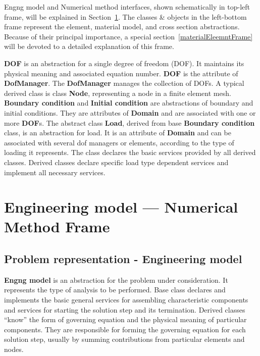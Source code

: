 \documentclass[12pt,draft]{article}
\newcommand{\class}[1]{{\bf #1}}
\begin{document}

Engng model and Numerical method interfaces, shown schematically in
top-left frame, will be explained in
Section~\ref{engngNummetsection}. The classes \& objects in the left-bottom frame represent the element,
material model, and cross section abstractions. Because of their
principal importance, a special 
section~\ref{materialEleemntFrame} will be devoted to a detailed
explanation of this frame. 

\class{DOF} is an abstraction for a single degree of freedom (DOF). It maintains
its physical meaning and associated equation number. \class{DOF} is
the attribute of \class{DofManager}. The \class{DofManager} manages the collection
of DOFs. A typical
derived class is class \class{Node}, representing a node in a finite element mesh.
\class{Boundary condition} and \class{Initial condition} are abstractions of boundary and
initial conditions. They are attributes of \class{Domain} and are associated
with one or more \class{DOF}s. The abstract class \class{Load}, derived from base \class{Boundary
condition} class, is an abstraction for load. It is an attribute of \class{Domain}
and can be associated with several dof managers or elements, according to
the type of loading it represents. The class declares the basic services provided by
all derived classes. Derived classes declare specific load type dependent
services and implement all necessary services.



\section {Engineering model --- Numerical Method Frame}
\label{engngNummetsection}

\subsection{Problem representation - Engineering model}
\class{Engng model} is an abstraction for the problem under
consideration. It represents the type of analysis to be performed.
Base class declares and implements the basic general services for assembling
characteristic components and services for starting the solution step and
its termination. Derived classes ``know'' the form of governing
equation and the physical meaning of  particular components. 
They are responsible for forming the governing equation for each solution
step,  usually by summing contributions from particular elements and
nodes.
\end{document}
